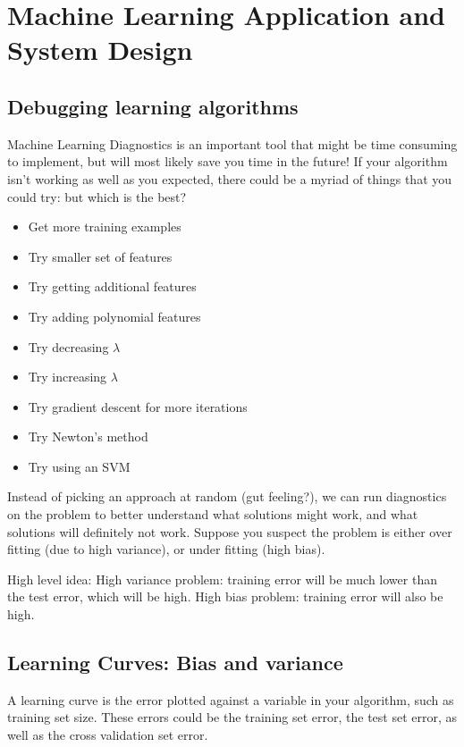 \documentclass[letterpaper,10pt]{article}
\begin{document}
\section{Machine Learning Application and System Design}




\subsection{Debugging learning algorithms}
Machine Learning Diagnostics is an important tool that might be time consuming to implement, but will most likely save you time in the future! If your algorithm isn't working as well as you expected, there could be a myriad of things that you could try: but which is the best?
	\begin{itemize}
	\item Get more training examples
	\item Try smaller set of features
	\item Try getting additional features
	\item Try adding polynomial features
	\item Try decreasing $\lambda$
	\item Try increasing $\lambda$
	\item Try gradient descent for more iterations
	\item Try Newton's method
	\item Try using an SVM
	\end{itemize}

Instead of picking an approach at random (gut feeling?), we can run diagnostics on the problem to better understand what solutions might work, and what solutions will definitely not work. Suppose you suspect the problem is either over fitting (due to high variance), or under fitting (high bias).

High level idea: High variance problem: training error will be much lower than the test error, which will be high. High bias problem: training error will also be high.


\subsection{Learning Curves: Bias and variance}

A learning curve is the error plotted against a variable in your algorithm, such as training set size. These errors could be the training set error, the test set error, as well as the cross validation set error.
\end{document}
